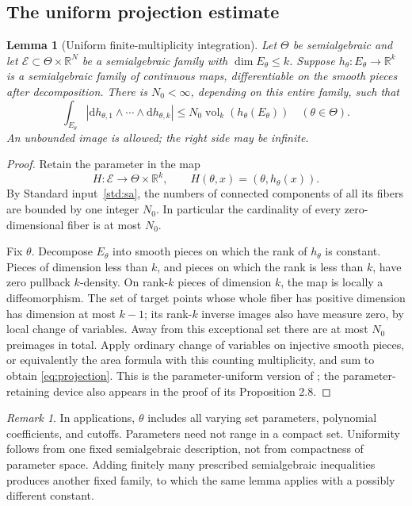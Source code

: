 \documentclass[11pt]{article}
\numberwithin{equation}{section}
\newtheorem{lemma}[theorem]{Lemma}
\theoremstyle{definition}
\theoremstyle{remark}
\newtheorem{remark}[theorem]{Remark}
\newcommand{\R}{\mathbb R}
\newcommand{\vol}{\operatorname{vol}}
\newcommand{\dd}{\mathrm d}
\begin{document}
\subsection{The uniform projection estimate}
\begin{lemma}[Uniform finite-multiplicity integration]\label{lem:projection}
Let $\Theta$ be semialgebraic and let
$\mathcal E\subset\Theta\times\R^N$ be a semialgebraic family with
$\dim E_\theta\le k$. Suppose
$h_\theta:E_\theta\to\R^k$ is a semialgebraic family of continuous
maps, differentiable on the smooth pieces after decomposition. There is
$N_0<\infty$, depending on this entire family, such that
\begin{equation}\label{eq:projection}
 \int_{E_\theta}|\dd h_{\theta,1}\wedge\cdots\wedge\dd h_{\theta,k}|
 \le N_0\vol_k(h_\theta(E_\theta))
 \quad(\theta\in\Theta).
\end{equation}
An unbounded image is allowed; the right side may be infinite.
\end{lemma}
\begin{proof}
Retain the parameter in the map
\[
 H:\mathcal E\longrightarrow\Theta\times\R^k,
 \qquad H(\theta,x)=(\theta,h_\theta(x)).
\]
By Standard input~\ref{std:sa}, the numbers of connected components of
all its fibers are bounded by one integer $N_0$. In particular the
cardinality of every zero-dimensional fiber is at most $N_0$.

Fix $\theta$. Decompose $E_\theta$ into smooth pieces on which the rank
of $h_\theta$ is constant. Pieces of dimension less than $k$, and pieces
on which the rank is less than $k$, have zero pullback $k$-density. On
rank-$k$ pieces of dimension $k$, the map is locally a diffeomorphism.
The set of target points whose whole fiber has positive dimension has
dimension at most $k-1$; its rank-$k$ inverse images also have measure
zero, by local change of variables. Away from this exceptional set there
are at most $N_0$ preimages in total. Apply ordinary change of variables
on injective smooth pieces, or equivalently the area formula with this
counting multiplicity, and sum to obtain \eqref{eq:projection}.
This is the parameter-uniform version of \cite[Proposition 2.5]{HKT};
the parameter-retaining device also appears in the proof of its
Proposition 2.8.
\end{proof}

\begin{remark}\label{rem:uniform-parameters}
In applications, $\theta$ includes all varying set parameters, polynomial
coefficients, and cutoffs. Parameters need not range in a compact set.
Uniformity follows from one fixed semialgebraic description, not from
compactness of parameter space. Adding finitely many prescribed
semialgebraic inequalities produces another fixed family, to which the
same lemma applies with a possibly different constant.
\end{remark}
\end{document}
